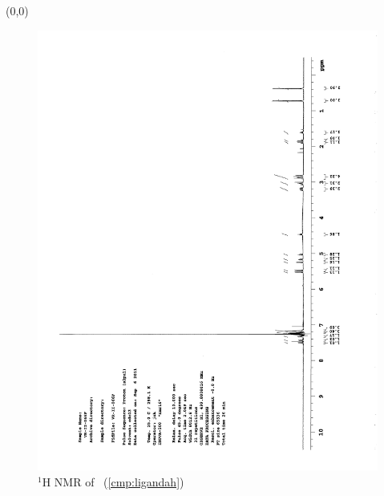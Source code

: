 \clearpage

\begin{textblock}{20}(0,0)
\begin{figure}[htb]
\caption{$^1$H NMR of \CMPligandah\ (\ref{cmp:ligandah})}
\includegraphics[scale=0.75, trim = 0mm 0mm 0mm 5mm,
clip]{chp_asymmetric/images/nmr/ligandahH}
\vspace{-100pt}
\end{figure}
\end{textblock}

